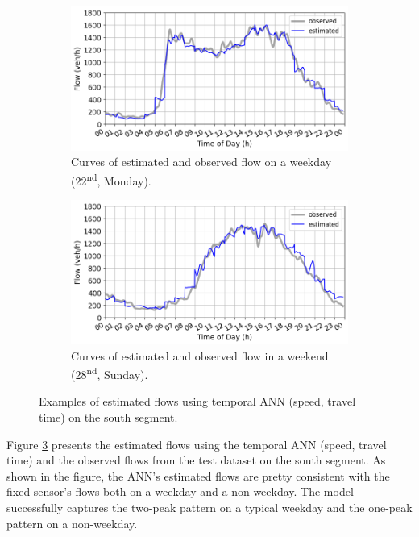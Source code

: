 \documentclass[english]{kththesis}
\begin{document}
\begin{figure}[!ht]
    \centering
    \begin{subfigure}{0.75\textwidth}
        \centering
        \includegraphics[width=\textwidth]{daily_estimation_south_weekday.png}
        \caption{Curves of estimated and observed flow on a weekday (22\textsuperscript{nd}, Monday).}
        \label{fig:estimation_weekday_south}
    \end{subfigure}
    \hfill
    \begin{subfigure}{0.75\textwidth}
        \centering
        \includegraphics[width=\textwidth]{daily_estimation_south_weekend.png}
        \caption{Curves of estimated and observed flow in a weekend (28\textsuperscript{nd}, Sunday).}
        \label{fig:estimation_weekend_south}
    \end{subfigure}
    \caption{Examples of estimated flows using temporal ANN (speed, travel time) on the south segment.}
    \label{fig:estimation_week_south}
\end{figure}

Figure \ref{fig:estimation_week_south} presents the estimated flows using the temporal ANN (speed, travel time) and the observed flows from the test dataset on the south segment. As shown in the figure, the ANN's estimated flows are pretty consistent with the fixed sensor's flows both on a weekday and a non-weekday. The model successfully captures the two-peak pattern on a typical weekday and the one-peak pattern on a non-weekday.
\end{document}
